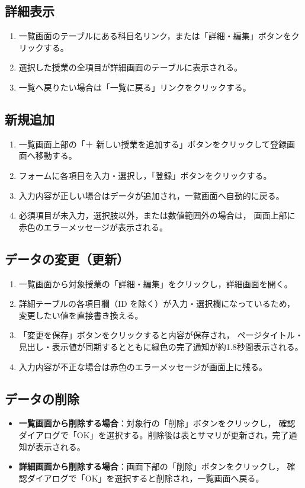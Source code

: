 \documentclass[
  a4paper,
  fontsize=11pt,
  line_length=40zw,
  number_of_lines=35,
  baselineskip=1.7zw
]{jlreq}
\begin{document}
\subsection{詳細表示}
\begin{enumerate}
  \item 一覧画面のテーブルにある科目名リンク，または「詳細・編集」ボタンをクリックする。
  \item 選択した授業の全項目が詳細画面のテーブルに表示される。
  \item 一覧へ戻りたい場合は「一覧に戻る」リンクをクリックする。
\end{enumerate}

\subsection{新規追加}
\begin{enumerate}
  \item 一覧画面上部の「＋ 新しい授業を追加する」ボタンをクリックして登録画面へ移動する。
  \item フォームに各項目を入力・選択し，「登録」ボタンをクリックする。
  \item 入力内容が正しい場合はデータが追加され，一覧画面へ自動的に戻る。
  \item 必須項目が未入力，選択肢以外，または数値範囲外の場合は，
    画面上部に赤色のエラーメッセージが表示される。
\end{enumerate}

\subsection{データの変更（更新）}
\begin{enumerate}
  \item 一覧画面から対象授業の「詳細・編集」をクリックし，詳細画面を開く。
  \item 詳細テーブルの各項目欄（ID を除く）が入力・選択欄になっているため，
    変更したい値を直接書き換える。
  \item 「変更を保存」ボタンをクリックすると内容が保存され，
    ページタイトル・見出し・表示値が同期するとともに緑色の完了通知が約1.8秒間表示される。
  \item 入力内容が不正な場合は赤色のエラーメッセージが画面上に残る。
\end{enumerate}

\subsection{データの削除}
\begin{itemize}
  \item \textbf{一覧画面から削除する場合}：対象行の「削除」ボタンをクリックし，
    確認ダイアログで「OK」を選択する。削除後は表とサマリが更新され，完了通知が表示される。
  \item \textbf{詳細画面から削除する場合}：画面下部の「削除」ボタンをクリックし，
    確認ダイアログで「OK」を選択すると削除され，一覧画面へ戻る。
\end{itemize}
\end{document}
